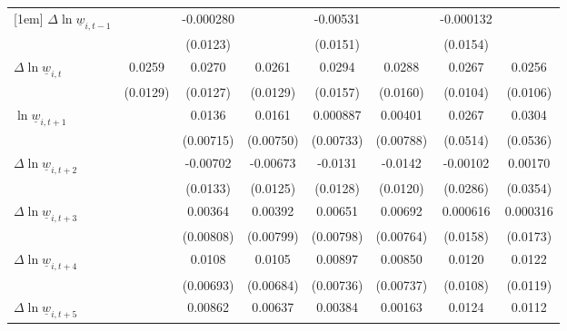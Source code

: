 {\begin{tabular}{l*{7}{c}}
[1em]
$\Delta \ln \underline{w}_{i,t-1}$&                  &-0.000280         &                  & -0.00531         &                  &-0.000132         &                  \\
          &                  & (0.0123)         &                  & (0.0151)         &                  & (0.0154)         &                  \\
[1em]
$\Delta \ln \underline{w}_{i,t}$&   0.0259\sym{*}  &   0.0270\sym{**} &   0.0261\sym{*}  &   0.0294\sym{*}  &   0.0288\sym{*}  &   0.0267\sym{**} &   0.0256\sym{**} \\
          & (0.0129)         & (0.0127)         & (0.0129)         & (0.0157)         & (0.0160)         & (0.0104)         & (0.0106)         \\
[1em]
$\ln \underline{w}_{i,t+1}$&                  &   0.0136\sym{*}  &   0.0161\sym{**} & 0.000887         &  0.00401         &   0.0267         &   0.0304         \\
          &                  &(0.00715)         &(0.00750)         &(0.00733)         &(0.00788)         & (0.0514)         & (0.0536)         \\
[1em]
$\Delta \ln \underline{w}_{i,t+2}$&                  & -0.00702         & -0.00673         &  -0.0131         &  -0.0142         & -0.00102         &  0.00170         \\
          &                  & (0.0133)         & (0.0125)         & (0.0128)         & (0.0120)         & (0.0286)         & (0.0354)         \\
[1em]
$\Delta \ln \underline{w}_{i,t+3}$&                  &  0.00364         &  0.00392         &  0.00651         &  0.00692         & 0.000616         & 0.000316         \\
          &                  &(0.00808)         &(0.00799)         &(0.00798)         &(0.00764)         & (0.0158)         & (0.0173)         \\
[1em]
$\Delta \ln \underline{w}_{i,t+4}$&                  &   0.0108         &   0.0105         &  0.00897         &  0.00850         &   0.0120         &   0.0122         \\
          &                  &(0.00693)         &(0.00684)         &(0.00736)         &(0.00737)         & (0.0108)         & (0.0119)         \\
[1em]
$\Delta \ln \underline{w}_{i,t+5}$&                  &  0.00862         &  0.00637         &  0.00384         &  0.00163         &   0.0124         &   0.0112         \\

\end{tabular}}

